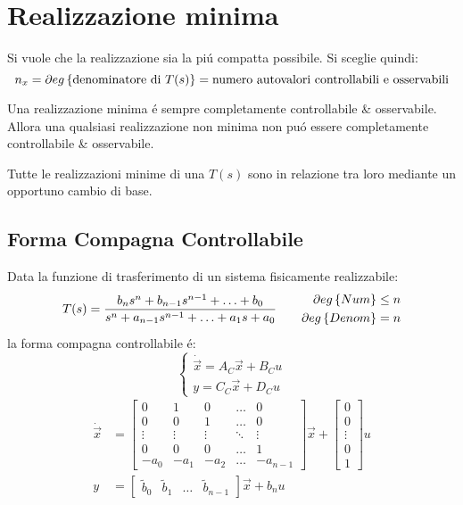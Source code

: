 \documentclass[../main.tex]{subfiles}
\begin{document}
	\section{Realizzazione minima}
		Si vuole che la realizzazione sia la pi\'u compatta possibile. Si sceglie quindi:
		\[
			n_x = \partial eg \left\lbrace \text{denominatore di}\ T(s) \right\rbrace = \text{numero autovalori controllabili e osservabili}
		\]
		
		Una realizzazione minima \'e sempre completamente controllabile \& osservabile. Allora una qualsiasi realizzazione non minima non pu\'o essere completamente controllabile \& osservabile.
		
		Tutte le realizzazioni minime di una $ T(s) $ sono in relazione tra loro mediante un opportuno cambio di base.
		
	\subsection{Forma Compagna Controllabile}
		Data la funzione di trasferimento di un sistema fisicamente realizzabile:
		\[
			T(s) = \dfrac{b_n s^n + b_{n-1} s^{n-1} + \ldots + b_0}{s^n + a_{n-1} s^{n-1} + \ldots + a_1 s + a_0}
			\qquad
			\begin{aligned}
				\partial eg \left\lbrace Num \right\rbrace \leq n\\
				\partial eg \left\lbrace Denom \right\rbrace = n
			\end{aligned}
		\]
		la forma compagna controllabile \'e:
		\[
			\begin{cases}
				\dot{\vec x} = A_C \vec x + B_C u\\
				y = C_C \vec x + D_C u
			\end{cases}
		\]
		\[
			\begin{aligned}
				\dot{\vec x} &=
				\begin{bmatrix}
					0 & 1 & 0 & \dots & 0\\
					0 & 0 & 1 & \dots & 0\\
					\vdots & \vdots & \vdots & \ddots & \vdots\\
					0 & 0 & 0 & \dots & 1\\
					-a_0 & -a_1 & -a_2 & \dots & -a_{n-1}
				\end{bmatrix} \vec x+
				\begin{bmatrix}
					0\\
					0\\
					\vdots\\
					0\\
					1
				\end{bmatrix} u
				\\
				y &=
				\begin{bmatrix}
					\tilde b_0 & \tilde b_1 & \dots & \tilde b_{n-1}
				\end{bmatrix} \vec x + b_n u
			\end{aligned}
		\]
\end{document}

